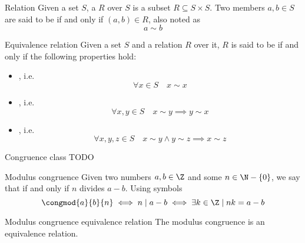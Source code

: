 \documentclass[a4paper, 12pt]{report}
\begin{document}

    \begin{frameddefn}{Relation}
        Given a set $S$, a  $R$ over $S$ is a subset $R \subseteq S \times S$. Two members $a, b \in S$ are said to be  if and only if $(a, b) \in R$, also noted as $$a \sim b$$
    \end{frameddefn}

    \begin{frameddefn}{Equivalence relation}
        Given a set $S$ and a relation $R$ over it, $R$ is said to be  if and only if the following properties hold:

        \begin{itemize}
            \item {}, i.e. $$\forall x \in S \quad x \sim x$$
            \item {}, i.e. $$\forall x, y \in S \quad x \sim y \implies y \sim x$$
            \item {}, i.e. $$\forall x, y, z \in S \quad x \sim y \land y \sim z \implies x \sim z$$
        \end{itemize}
    \end{frameddefn}

    \begin{frameddefn}{Congruence class}
        TODO
    \end{frameddefn}

    \begin{frameddefn}{Modulus congruence}
        Given two numbers $a, b \in \Z$ and some $n \in \N - \{0\}$, we say that  if and only if $n$ divides $a - b$. Using symbols $$\congmod{a}{b}{n} \iff n \mid a - b \iff \exists k \in \Z \mid nk = a - b$$
    \end{frameddefn}

    \begin{framedprop}{Modulus congruence equivalence relation}
        The modulus congruence is an equivalence relation.
    \end{framedprop}
\end{document}
